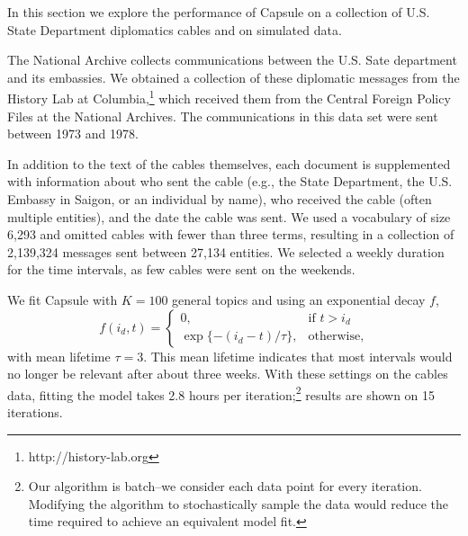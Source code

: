 




In this section we explore the performance of Capsule on a collection of U.S. State Department diplomatics cables and on simulated data.

The National Archive collects communications between the U.S. Sate department and its embassies.  We obtained a collection of these diplomatic messages from the History Lab at Columbia,\footnote{http://history-lab.org} which received them from the Central Foreign Policy Files at the National Archives.  The communications in this data set were sent between 1973 and 1978.

In addition to the text of the cables themselves, each document is supplemented with information about who sent the cable (e.g., the State Department, the U.S. Embassy in Saigon, or an individual by name), who received the cable (often multiple entities), and the date the cable was sent.  We used a vocabulary of size 6,293 and omitted cables with fewer than three terms, resulting in a collection of 2,139,324 messages sent between 27,134 entities.  We selected a weekly duration for the time intervals, as few cables were sent on the weekends.

We fit Capsule with $K=100$ general topics and using an exponential decay $f$,
\begin{equation}
f(i_d, t) = 
\begin{cases}
    0,			& \text{if } t > i_d\\
    \exp\{-(i_d - t) / \tau\},          & \text{otherwise,}
\end{cases}
\end{equation}
with mean lifetime $\tau=3$.  This mean lifetime indicates that most intervals would no longer be relevant after about three weeks.  With these settings on the cables data, fitting the model takes 2.8 hours per iteration;\footnote{Our algorithm is batch--we consider each data point for every iteration.  Modifying the algorithm to stochastically sample the data would reduce the time required to achieve an equivalent model fit.} results are shown on 15 iterations.

